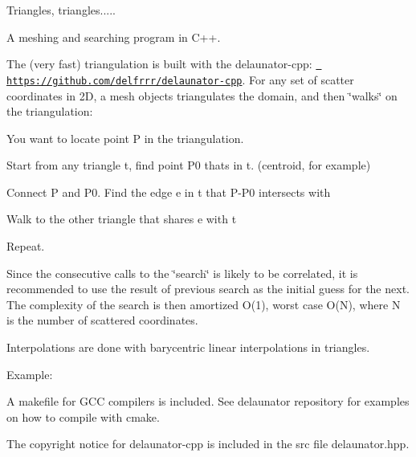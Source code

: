 Triangles, triangles.....

A meshing and searching program in C++.

The (very fast) triangulation is built with the delaunator-\/cpp\+: \href{https://github.com/delfrrr/delaunator-cpp}{\texttt{ https\+://github.\+com/delfrrr/delaunator-\/cpp}}. For any set of scatter coordinates in 2D, a mesh objects triangulates the domain, and then \char`\"{}walks\char`\"{} on the triangulation\+:


\begin{DoxyItemize}
\item You want to locate point P in the triangulation.
\item Start from any triangle t, find point P0 that\textquotesingle{}s in t. (centroid, for example)
\item Connect P and P0. Find the edge e in t that P-\/\+P0 intersects with
\item Walk to the other triangle that shares e with t
\item Repeat.
\end{DoxyItemize}

Since the consecutive calls to the \char`\"{}search\char`\"{} is likely to be correlated, it is recommended to use the result of previous search as the initial guess for the next. The complexity of the search is then amortized O(1), worst case O(\+N), where N is the number of scattered coordinates.

Interpolations are done with barycentric linear interpolations in triangles.

Example\+: 
\begin{DoxyCode}{0}
\DoxyCodeLine{}
\DoxyCodeLine{}
\DoxyCodeLine{\}}
\end{DoxyCode}


A makefile for G\+CC compilers is included. See delaunator repository for examples on how to compile with cmake.

The copyright notice for delaunator-\/cpp is included in the src file delaunator.\+hpp. 